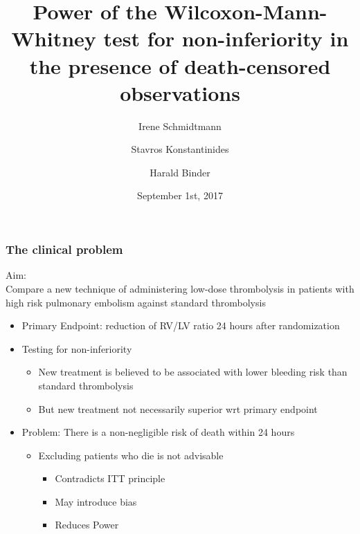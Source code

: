 \documentclass[xcolor=pdftex,dvipsnames,table]{beamer}\usepackage[]{graphicx}\usepackage[]{color}
\title{Power of the Wilcoxon-Mann-Whitney test for non-inferiority in the presence 
of death-censored observations} %
\author{Irene Schmidtmann\inst{1} \and 
Stavros Konstantinides\inst{2} \and 
Harald Binder\inst{3}}
\institute[University Medical Center Johannes-Gutenberg-University Mainz] %
{
  \inst{1}%
  Institute for Medical Biostatistics, Epidemiology and Informatics (IMBEI)
  \and
  \inst{2}%
  Center for Thrombosis and Hemostasis Mainz (CTH)\\
University Medical Center Johannes-Gutenberg-University Mainz
\and
\inst{3}%
Institute for Medical Biometry and Statistics  \\
University of Freiburg}
\date{September 1st, 2017}
\begin{document}


\begin{frame}[plain] %
\titlepage
\end{frame}

\begin{frame} %
\frametitle{The clinical problem}
Aim:\\
Compare a new technique of administering low-dose thrombolysis in patients with high risk pulmonary embolism against standard thrombolysis
\begin{itemize}
	\item Primary Endpoint: reduction of RV/LV ratio 24 hours after randomization
	\item Testing for non-inferiority 
	\begin{itemize}
		\item New treatment is believed to be associated with lower bleeding risk than standard thrombolysis
		\item But new treatment not necessarily superior wrt primary endpoint
	\end{itemize}
	\item Problem: There is a non-negligible risk of death within 24 hours
	\begin{itemize}
		\item Excluding patients who die is not advisable
		\begin{itemize}
			\item Contradicts ITT principle
			\item May introduce bias
			\item Reduces Power
		\end{itemize}
	\end{itemize}
\end{itemize}
\end{frame}
\end{document}
